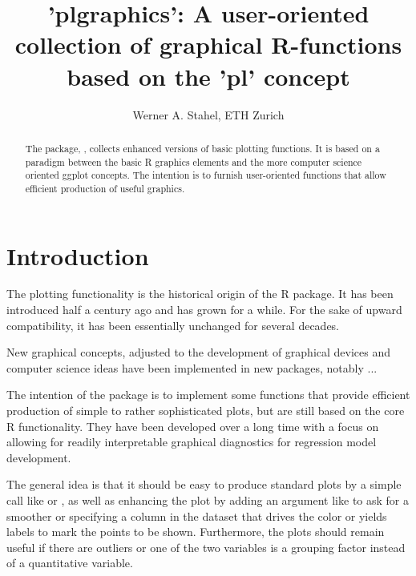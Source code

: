 \documentclass[11pt]{article}\usepackage[]{graphicx}\usepackage[]{color}
\begin{document}
\baselineskip 15pt
\parskip 10pt

\title{\vspace*{-10mm}
'plgraphics': A user-oriented collection of graphical R-functions based on
 the 'pl' concept}
\author{Werner A. Stahel, ETH Zurich}
\maketitle

\begin{abstract}\noindent
The package, , collects enhanced versions of basic plotting
functions. It is based on a paradigm between the basic R graphics elements
and the more computer science oriented ggplot concepts.
The intention is to furnish user-oriented functions that allow efficient
production of useful graphics.
\end{abstract}



\tableofcontents

\section{Introduction}

The plotting functionality is the historical origin of the R package.
It has been introduced half a century ago and has grown for a while.
For the sake of upward compatibility, it has been essentially unchanged for
several decades. 

New graphical concepts, adjusted to the development of graphical devices
and computer science ideas have been implemented in new packages, 
notably  ...

The intention of the package  is to implement some functions
that provide efficient production of simple to rather sophisticated plots,
but are still based on the core R functionality.
They have been developed over a long time with a focus on allowing 
for readily interpretable graphical diagnostics for regression model
development. 

The general idea is that it should be easy to produce standard plots 
by a simple call like  or , 
as well as enhancing the plot by adding an argument like  
to ask for a smoother or specifying 
a column in the dataset that drives the color or yields labels to mark the
points to be shown. 
Furthermore, the plots should remain useful if there are outliers 
or one of the two
variables is a grouping factor instead of a quantitative variable.
\end{document}
